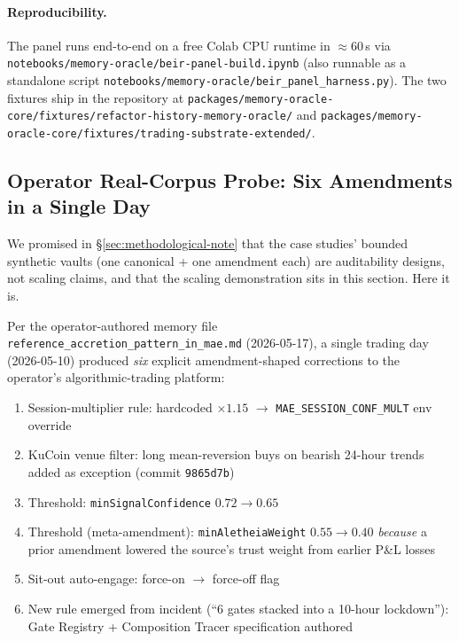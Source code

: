 \documentclass[runningheads]{llncs}
\begin{document}
\paragraph{Reproducibility.} The panel runs end-to-end on a free
Colab CPU runtime in $\approx{}60$\,s via
\texttt{notebooks/memory-oracle/beir-panel-build.ipynb} (also
runnable as a standalone script
\texttt{notebooks/memory-oracle/beir\_panel\_harness.py}). The two
fixtures ship in the repository at
\texttt{packages/memory-oracle-core/fixtures/refactor-history-memory-oracle/}
and
\texttt{packages/memory-oracle-core/fixtures/trading-substrate-extended/}.

\subsection{Operator Real-Corpus Probe: Six Amendments in a Single Day}
\label{sec:operator-corpus}

We promised in \S\ref{sec:methodological-note} that the case studies' bounded
synthetic vaults (one canonical + one amendment each) are auditability
designs, not scaling claims, and that the scaling demonstration sits in this
section. Here it is.

Per the operator-authored memory file
\texttt{reference\_accretion\_pattern\_in\_mae.md} (2026-05-17), a single
trading day (2026-05-10) produced \emph{six} explicit amendment-shaped
corrections to the operator's algorithmic-trading platform:

\begin{enumerate}
  \item Session-multiplier rule: hardcoded $\times 1.15$ $\rightarrow$
        \texttt{MAE\_SESSION\_CONF\_MULT} env override
  \item KuCoin venue filter: long mean-reversion buys on bearish 24-hour
        trends added as exception (commit \texttt{9865d7b})
  \item Threshold: \texttt{minSignalConfidence} $0.72 \rightarrow 0.65$
  \item Threshold (meta-amendment): \texttt{minAletheiaWeight}
        $0.55 \rightarrow 0.40$ \emph{because} a prior amendment
        lowered the source's trust weight from earlier P\&L losses
  \item Sit-out auto-engage: force-on $\rightarrow$ force-off flag
  \item New rule emerged from incident (``6 gates stacked into a
        10-hour lockdown''): Gate Registry + Composition Tracer
        specification authored
\end{enumerate}
\end{document}
